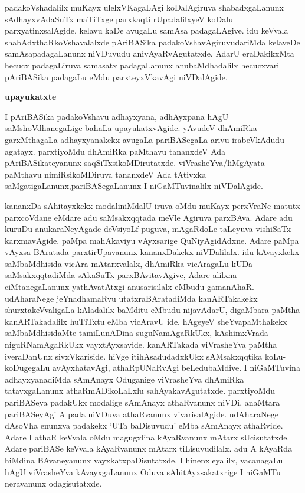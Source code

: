 padakoVshadalilx muKayx ulelxVKagaLAgi koDalAgiruva shabadxgaLanunx sAdhayxvAdaSuTx maTiTxge parxkaqti rUpadalilxyeV koDalu parxyatinxsa\-lAgide. kelavu kaDe avugaLu samAsa padagaLAgive. idu keVvala shabAdxthaRkoVshavalalxde pAriBASika padakoVshavAgiru\-vudariMda kelaveDe samAsapadagaLanunx niVDuvudu anivAyaRvAgutatxde. AdarU eraDakikxMta hecucx padagaLiruva samasatx padagaLanunx anubaMdhadalilx hecucxvari pAriBASika padagaLu eMdu parxteyxVkavAgi niVDalAgide.

\smallskip
\begin{center}
\textbf{upayukatxte}
\end{center}
\smallskip

I pAriBASika padakoVshavu adhayxyana, adhAyxpana hAgU saMshoVdhanegaLige bahaLa upayukatxvAgide. yAvudeV dhAmiRka garxMthagaLa adhayxyanakekx avugaLa pariBASegaLa arivu irabeVkAdudu agatayx. parxtiyoMdu dhAmiRka paMthavu tananxdeV Ada pAri\-BASikateyanunx saqSiTxsikoMDirutatxde. viVrasheYva/liMgAyata paMthavu nimiRsikoMDiruva tananxdeV Ada tAtivxka saMgatigaLanunx,\break pariBASegaLanunx I niGaMTuvinalilx niVDalAgide. 

kananxDa sAhitayxkekx modaliniMdalU iruva oMdu muKayx perxVraNe matutx parxcoVdane eMdare adu saMsakxqqtada meVle Agiruva parxBAva. Adare adu kuruDu anukaraNeyAgade deVsiyoLf puguva, mAgaRdoLe taLeyuva vishiSaTx karxmavAgide. paMpa mahA\-kaviyu vAyxsarige QuNiyAgidAdxne. Adare paMpa vAyxsa BAratada parxtirUpavanunx kananxDakekx niVDalilalx. idu kAvayxkekx saMbaMdhisida vicAra mAtarxvalalx, dhAmiRka vicAragaLu kUDa saMsakxqqtadiMda sAkaSuTx parxBAvitavAgive, Adare alilxna ciMtanegaLanunx yathAvatAtxgi anusarisilalx eMbudu gamanAhaR. udAharaNege jeYnadhamaRvu utatxraBAratadiMda kanARTakakekx shurxtakeVvaligaLa kAladalilx baMditu eMbudu nijavAdarU, digaMbara paMtha kanARTakadalilx huTiTxtu eMba vicAravU ide. hAgeyeV sheYvapaMthakekx saMbaMdhisidaMte tamiLunADina suguNamAgaRkUkx, kAshimxVrada niguRNamAgaRkUkx vayxtAyxsavide. kanARTakada viVrasheYva paMtha iveraDanUnx sivxVkariside. hiVge itihAsadudadxkUkx sAMsakxqqtika koLu-koDugegaLu avAyxhatavAgi, athaRpUNaRvAgi beLedubaMdive. I niGaMTuvina adhayxyanadiMda sAmAnayx Oduganige viVrasheYva dhAmiRka tatavxgaLanunx athaRmADikoLaLxlu sahAyakavAgutatxde. parxtiyoMdu pari\-BASeya padakUkx modalige sAmAnayx athaRvanunx niVDi, anaMtara pariBASeyAgi A pada niVDuva athaRvanunx vivarisalAgide. udAharaNege dAsoVha enunxva padakekx `UTa baDisuvudu' eMba sAmAnayx athaRvide. Adare I athaR keVvala oMdu magugxlina kAyaRvanunx mAtarx sUcisutatxde. Adare pariBASe keVvala kAyaRvanunx mAtarx tiLisuvudilalx. adu A kAyaRda hiMdina BAvaneyanunx vayxkatxpaDisutatxde. I hinenxleyalilx, vacanagaLu hAgU viVrasheYva kAvayxgaLanunx Oduva sAhitAyxsakatxrige I niGaMTu neravanunx odagisutatxde.

